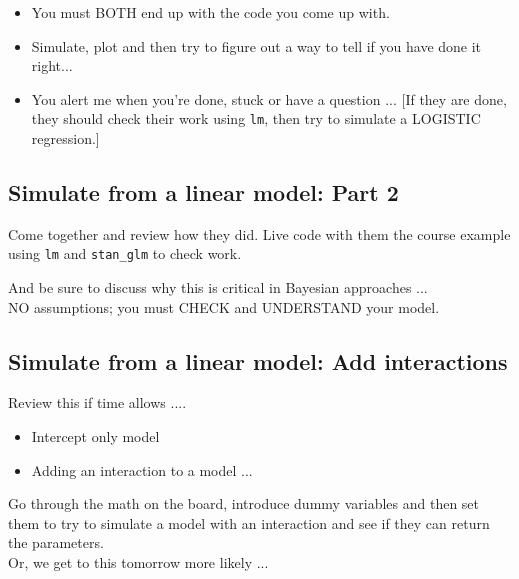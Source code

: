 \documentclass[11pt]{article}
\begin{document}
\begin{itemize}
\item You must BOTH end up with the code you come up with.
\item Simulate, plot and then try to figure out a way to tell if you have done it right... 
\item You alert me when you're done, stuck or have a question ... [If they are done, they should check their work using \verb|lm|, then try to simulate a LOGISTIC regression.]
\end{itemize}


\subsection{Simulate from a linear model: Part 2}

Come together and review how they did. Live code with them the course example using \verb|lm| and \verb|stan_glm| to check work. 

And be sure to discuss why this is critical in Bayesian approaches ...\\
NO assumptions; you must CHECK and UNDERSTAND your model.

\subsection{Simulate from a linear model: Add interactions}

Review this if time allows .... 
\begin{itemize}
\item Intercept only model
\item Adding an interaction to a model ... 
\end{itemize}

Go through the math on the board, introduce dummy variables and then set them to try to simulate a model with an interaction and see if they can return the parameters. \\
Or, we get to this tomorrow more likely ... 
\end{document}
